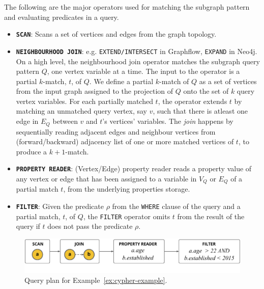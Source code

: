 The following are the major operators used for matching the subgraph pattern and evaluating predicates in a query.
\begin{itemize}
	
	\item \textbf{\texttt{SCAN}}: Scans a set of vertices and edges from the graph topology.
	
	\item \textbf{\texttt{NEIGHBOURHOOD JOIN}}: e.g. \texttt{EXTEND/INTERSECT} in Graphflow, \texttt{EXPAND} in Neo4j. On a high level, the neighbourhood join operator matches the subgraph query pattern $Q$, one vertex variable at a time. The input to the operator is a partial $k$-match, $t$, of $Q$. We define a partial $k$-match of $Q$ as a set of vertices from the input graph assigned to the projection of $Q$ onto the set of $k$ query vertex variables. For each partially matched $t$, the operator extends $t$ by matching an unmatched query vertex, say $v$, such that there is atleast one edge in $E_Q$ between $v$ and $t$'s vertices' variables. The \emph{join} happens by sequentially reading adjacent edges and neighbour vertices from (forward/backward) adjacency list of one or more matched vertices of $t$, to produce a $k+1$-match.

	\item \textbf{\texttt{PROPERTY READER}}: (Vertex/Edge) property reader reads a property value of any vertex or edge that has been assigned to a variable in $V_Q$ or $E_Q$ of a partial match $t$, from the underlying properties storage. 

	\item \textbf{\texttt{FILTER}}: Given the predicate $\rho$ from the \texttt{WHERE} clause of the query and a partial match, $t$, of $Q$, the \texttt{FILTER} operator omits $t$ from the result of the query if $t$ does not pass the predicate $\rho$.
	
\end{itemize}

\begin{figure}
	\hfill\includegraphics[scale=0.80]{img/ex-qp}\hfill
	\vspace{-8pt}
	\caption{Query plan for Example~\ref{ex:cypher-example}.}
	\label{fig:ex-qp}
	\vspace{-8pt}
\end{figure}

